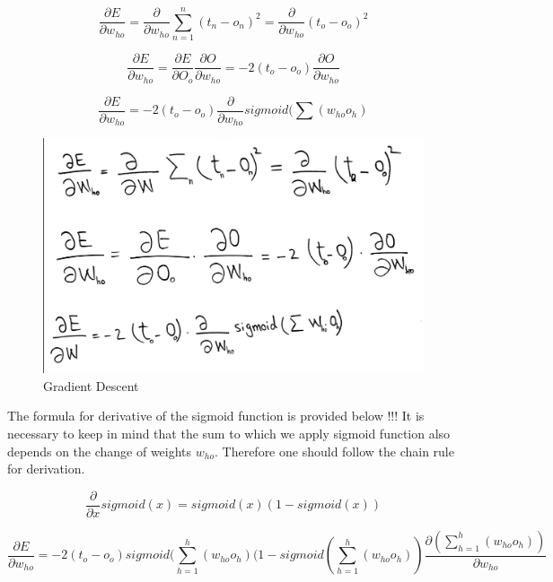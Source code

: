 \begin{equation}
\frac{\partial E}{\partial w_{ho}}=\frac{\partial}{\partial w_{ho}}\displaystyle\sum_{n=1}^{n} (t_n-o_n)^2=\frac{\partial}{\partial w_{ho}}(t_o-o_o)^2
\end{equation}

\begin{equation}
\frac{\partial E}{\partial w_{ho}}=\frac{\partial E}{\partial O_{o}}\frac{\partial O}{\partial w_{ho}}=-2(t_o-o_o)\frac{\partial O}{\partial w_{ho}}
\end{equation}

\begin{equation}
\frac{\partial E}{\partial w_{ho}}=-2(t_o-o_o)\frac{\partial}{\partial w_{ho}}sigmoid(\sum(w_{ho}o_h)
\end{equation}

\begin{figure}[H]
    \includegraphics[width=\linewidth]{pics/formula2.png}
    \caption{\label{fig:bp} Gradient Descent}
\end{figure}

The formula for derivative of the sigmoid function is provided below !!! It is necessary to keep in mind that the sum to which we apply sigmoid function also depends on the change of weights \(w_{ho}\). Therefore one should follow the chain rule for derivation.

\begin{equation}
\frac{\partial}{\partial x}sigmoid(x)=sigmoid(x)(1-sigmoid(x))
\end{equation}

\begin{equation}
\frac{\partial E}{\partial w_{ho}}=-2(t_o-o_o)sigmoid(\sum_{h=1}^{h} (w_{ho}o_h)(1-sigmoid(\sum_{h=1}^{h} (w_{ho}o_h))\frac{\partial (\sum_{h=1}^{h} (w_{ho}o_h))}{\partial w_{ho}}
\end{equation}


